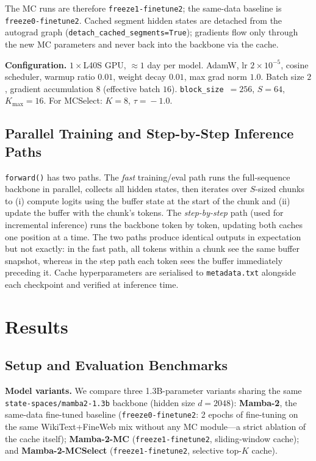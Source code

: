 \documentclass[conference]{IEEEtran}
\begin{document}
The MC runs are therefore \texttt{freeze1-finetune2}; the same-data baseline is \texttt{freeze0-finetune2}. Cached segment hidden states are detached from the autograd graph (\texttt{detach\_cached\_segments=True}); gradients flow only through the new MC parameters and never back into the backbone via the cache.

\textbf{Configuration.}
$1\!\times\!$L40S GPU, $\approx 1$ day per model. AdamW, lr $2\!\times\!10^{-5}$, cosine scheduler, warmup ratio $0.01$, weight decay $0.01$, max grad norm $1.0$. Batch size $2$, gradient accumulation $8$ (effective batch $16$). \texttt{block\_size}~$=256$, $S\!=\!64$, $K_{\max}\!=\!16$. For MCSelect: $K\!=\!8$, $\tau\!=\!-1.0$.

\subsection{Parallel Training and Step-by-Step Inference Paths}

\texttt{forward()} has two paths. The \emph{fast} training/eval path runs the full-sequence backbone in parallel, collects all hidden states, then iterates over $S$-sized chunks to (i) compute logits using the buffer state at the start of the chunk and (ii) update the buffer with the chunk's tokens. The \emph{step-by-step} path (used for incremental inference) runs the backbone token by token, updating both caches one position at a time. The two paths produce identical outputs in expectation but not exactly: in the fast path, all tokens within a chunk see the same buffer snapshot, whereas in the step path each token sees the buffer immediately preceding it. Cache hyperparameters are serialised to \texttt{metadata.txt} alongside each checkpoint and verified at inference time.

\section{Results}

\subsection{Setup and Evaluation Benchmarks}

\textbf{Model variants.} We compare three 1.3B-parameter variants sharing the same \texttt{state-spaces/mamba2-1.3b} backbone (hidden size $d{=}2048$): \textbf{Mamba-2}, the same-data fine-tuned baseline (\texttt{freeze0-finetune2}: 2 epochs of fine-tuning on the same WikiText+FineWeb mix without any MC module---a strict ablation of the cache itself); \textbf{Mamba-2-MC} (\texttt{freeze1-finetune2}, sliding-window cache); and \textbf{Mamba-2-MCSelect} (\texttt{freeze1-finetune2}, selective top-$K$ cache).
\end{document}
